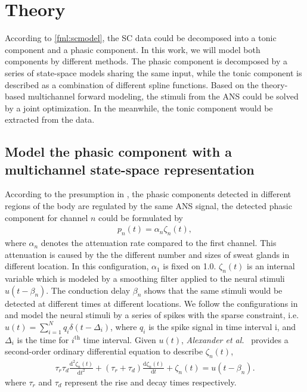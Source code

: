 \documentclass[10pt,conference]{ieeeconf}
\providecommand{\od}{\mathrm{d}}
\begin{document}
\section{Theory}

According to \eqref{fml:scmodel}, the SC data could be decomposed into a tonic component and a phasic component. In this work, we will model both components by different methods. The phasic component is decomposed by a series of state-space models sharing the same input, while the tonic component is described as a combination of different spline functions. Based on the theory-based multichannel forward modeling, the stimuli from the ANS could be solved by a joint optimization. In the meanwhile, the tonic component would be extracted from the data.

\subsection{Model the phasic component with a multichannel state-space representation}
According to the presumption in \cite{alexander2005separating,society2012publication,amin2019robust}, the phasic components detected in different regions of the body are regulated by the same ANS signal, the detected phasic component for channel $n$ could be formulated by
\begin{align}
p_n(t) = \alpha_n \zeta_n (t),
\end{align}
where $\alpha_n$ denotes the attenuation rate compared to the first channel. This attenuation is caused by the the different number and sizes of sweat glands in different location. In this configuration, $\alpha_1$ is fixed on 1.0. $\zeta_n(t)$ is an internal variable which is modeled by a smoothing filter applied to the neural stimuli $u(t-\beta_n)$. The conduction delay $\beta_n$ shows that the
same stimuli would be detected at different times at different locations. We follow the configurations in \cite{greco2015cvxeda,amin2019robust} and model the neural stimuli by a series of spikes with the sparse constraint, i.e. $u(t) = \sum_{i=1}^N q_i \delta(t - \Delta_i)$, where $q_i$ is the spike signal in time interval i, and $\Delta_i$ is the time for $i^{\mathrm{th}}$ time interval. Given $u(t)$, \textit{Alexander et al.}~\cite{alexander2005separating} provides a second-order ordinary differential equation to describe $\zeta_n(t)$,
\begin{align} \label{fml:the:ode}
\tau_r \tau_d \frac{\od^2 \zeta_n(t)}{\od t^2} + (\tau_r + \tau_d) \frac{\od \zeta_n(t)}{\od t} + \zeta_n(t) = u(t - \beta_n).
\end{align}
where $\tau_r$ and $\tau_d$ represent the rise and decay times respectively.
\end{document}
